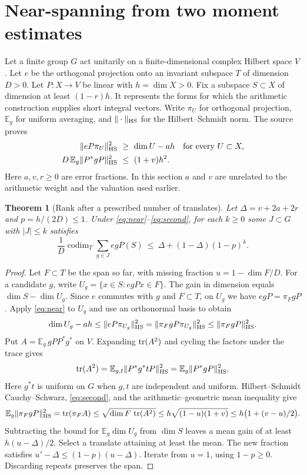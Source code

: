 \documentclass[11pt]{article}
\newtheorem{theorem}{Theorem}[section]\newtheorem{lemma}[theorem]{Lemma}\newtheorem{corollary}[theorem]{Corollary}
\begin{document}
\section{Near-spanning from two moment estimates}\label{sec:cover}
Let a finite group $G$ act unitarily on a finite-dimensional complex Hilbert space $V$. Let $e$ be the orthogonal projection onto an invariant subspace $T$ of dimension $D>0$. Let $P:X\to V$ be linear with $h=\dim X>0$. Fix a subspace $S\subset X$ of dimension at least $(1-r)h$. It represents the forms for which the arithmetic construction supplies short integral vectors. Write $\pi_U$ for orthogonal projection, $\mathbb E_g$ for uniform averaging, and $\|\cdot\|_{\rm HS}$ for the Hilbert--Schmidt norm. The source proves
\begin{align}
 \|eP\pi_U\|_{\rm HS}^2 &\ \ge\ \dim U-ah
                 &&\text{for every } U\subset X, \label{eq:near}\\
 D\,\mathbb E_g\|P^*gP\|_{\rm HS}^2 &\ \le\ (1+v)h^2 .
                                      \label{eq:second}
\end{align}
Here $a,v,r\ge0$ are error fractions. In this section $a$ and $v$ are unrelated to the arithmetic weight and the valuation used earlier.

\begin{theorem}[Rank after a prescribed number of translates]\label{th:span}
Let $\Delta=v+2a+2r$ and $p=h/(2D)\le1$. Under \eqref{eq:near}--\eqref{eq:second}, for each $k\ge0$ some $J\subset G$ with $|J|\le k$ satisfies
\[
   \frac1D\operatorname{codim}_T\sum_{g\in J}e gP(S)
       \ \le\ \Delta+(1-\Delta)(1-p)^k.
\]
\end{theorem}
\begin{proof}
Let $F\subset T$ be the span so far, with missing fraction $u=1-\dim F/D$. For a candidate $g$, write $U_g=\{x\in S:egPx\in F\}$. The gain in dimension equals $\dim S-\dim U_g$. Since $e$ commutes with $g$ and $F\subset T$, on $U_g$ we have $egP=\pi_FgP$. Apply \eqref{eq:near} to $U_g$ and use an orthonormal basis to obtain
\[
 \dim U_g-ah\le\|eP\pi_{U_g}\|_{\rm HS}^2
 =\|\pi_F gP\pi_{U_g}\|_{\rm HS}^2\le\|\pi_FgP\|_{\rm HS}^2 .
\]
Put $A=\mathbb E_g\,gPP^*g^*$ on $V$. Expanding $\operatorname{tr}(A^2)$ and cycling the factors under the trace gives
\[
     \operatorname{tr}(A^2)=\mathbb E_{g,t}\|P^*g^*tP\|_{\rm HS}^2
             =\mathbb E_g\|P^*gP\|_{\rm HS}^2.
\]
Here $g^*t$ is uniform on $G$ when $g,t$ are independent and uniform. Hilbert--Schmidt Cauchy--Schwarz, \eqref{eq:second}, and the arithmetic--geometric mean inequality give
\[
 \mathbb E_g\|\pi_FgP\|_{\rm HS}^2
   =\operatorname{tr}(\pi_F A)
   \le\sqrt{\dim F\,\operatorname{tr}(A^2)}
   \le h\sqrt{(1-u)(1+v)}
   \le h\bigl(1+(v-u)/2\bigr).
\]
Subtracting the bound for $\mathbb E_g\dim U_g$ from $\dim S$ leaves a mean gain of at least $h(u-\Delta)/2$. Select a translate attaining at least the mean. The new fraction satisfies $u'-\Delta\le(1-p)(u-\Delta)$. Iterate from $u=1$, using $1-p\ge0$. Discarding repeats preserves the span.
\end{proof}
\end{document}
